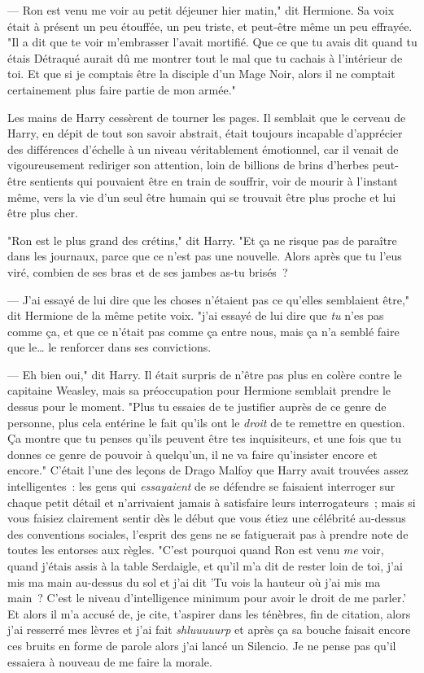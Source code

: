 --- Ron est venu me voir au petit déjeuner hier matin," dit Hermione. Sa voix était à présent un peu étouffée, un peu triste, et peut-être même un peu effrayée. "Il a dit que te voir m'embrasser l'avait mortifié. Que ce que tu avais dit quand tu étais Détraqué aurait dû me montrer tout le mal que tu cachais à l'intérieur de toi. Et que si je comptais être la disciple d'un Mage Noir, alors il ne comptait certainement plus faire partie de mon armée."

Les mains de Harry cessèrent de tourner les pages. Il semblait que le cerveau de Harry, en dépit de tout son savoir abstrait, était toujours incapable d'apprécier des différences d'échelle à un niveau véritablement émotionnel, car il venait de vigoureusement rediriger son attention, loin de billions de brins d'herbes peut-être sentients qui pouvaient être en train de souffrir, voir de mourir à l'instant même, vers la vie d'un seul être humain qui se trouvait être plus proche et lui être plus cher.

"Ron est le plus grand des crétins," dit Harry. "Et ça ne risque pas de paraître dans les journaux, parce que ce n'est pas une nouvelle. Alors après que tu l'eus viré, combien de ses bras et de ses jambes as-tu brisés~?

--- J'ai essayé de lui dire que les choses n'étaient pas ce qu'elles semblaient être," dit Hermione de la même petite voix. "j'ai essayé de lui dire que \emph{tu} n'es pas comme ça, et que ce n'était pas comme ça entre nous, mais ça n'a semblé faire que le… le renforcer dans ses convictions.

--- Eh bien oui," dit Harry. Il était surpris de n'être pas plus en colère contre le capitaine Weasley, mais sa préoccupation pour Hermione semblait prendre le dessus pour le moment. "Plus tu essaies de te justifier auprès de ce genre de personne, plus cela entérine le fait qu'ils ont le \emph{droit} de te remettre en question. Ça montre que tu penses qu'ils peuvent être tes inquisiteurs, et une fois que tu donnes ce genre de pouvoir à quelqu'un, il ne va faire qu'insister encore et encore." C'était l'une des leçons de Drago Malfoy que Harry avait trouvées assez intelligentes~: les gens qui \emph{essayaient} de se défendre se faisaient interroger sur chaque petit détail et n'arrivaient jamais à satisfaire leurs interrogateurs~; mais si vous faisiez clairement sentir dès le début que vous étiez une célébrité au-dessus des conventions sociales, l'esprit des gens ne se fatiguerait pas à prendre note de toutes les entorses aux règles. "C'est pourquoi quand Ron est venu \emph{me} voir, quand j'étais assis à la table Serdaigle, et qu'il m'a dit de rester loin de toi, j'ai mis ma main au-dessus du sol et j'ai dit 'Tu vois la hauteur où j'ai mis ma main~? C'est le niveau d'intelligence minimum pour avoir le droit de me parler.' Et alors il m'a accusé de, je cite, t'aspirer dans les ténèbres, fin de citation, alors j'ai resserré mes lèvres et j'ai fait \emph{shluuuuurp} et après ça sa bouche faisait encore ces bruits en forme de parole alors j'ai lancé un Silencio. Je ne pense pas qu'il essaiera à nouveau de me faire la morale.

